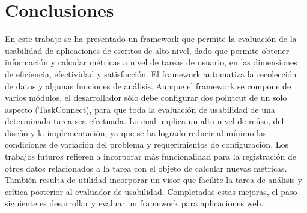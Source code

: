 \section{Conclusiones}
\label{sec:conclusiones}
En este trabajo se ha presentado un framework que permite la evaluación de la usabilidad de aplicaciones de escritos de alto nivel, dado que permite obtener información y calcular métricas a nivel de tareas de usuario, en las dimensiones de eficiencia, efectividad y satisfacción. El framework automatiza la recolección de datos y algunas funciones de análisis. Aunque el framework se compone de varios módulos, el desarrollador sólo debe configurar dos pointcut de un solo aspecto (TaskConnect), para que toda la evaluación de usabilidad de una determinada tarea sea efectuada. Lo cual implica un alto nivel de reúso, del diseño y la implementación, ya que se ha logrado reducir al mínimo las condiciones de variación del problema y requerimientos de configuración. 
Los trabajos futuros refieren a incorporar más funcionalidad para la registración de otros datos relacionados a la tarea con el objeto de calcular nuevas métricas. También resulta de utilidad incorporar un visor que facilite la tarea de análisis y crítica posterior al evaluador de usabilidad. Completadas estas mejoras, el paso siguiente es desarrollar y evaluar un framework para aplicaciones web.
